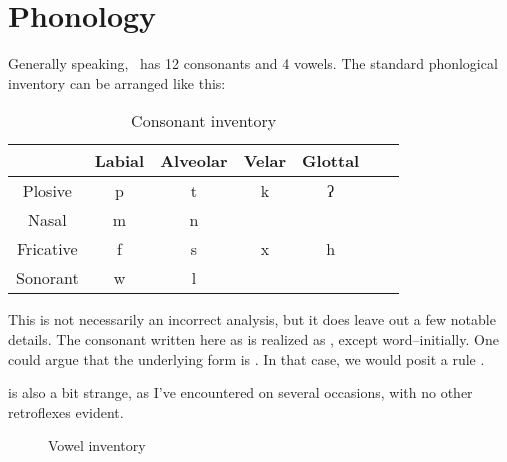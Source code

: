\chapter{Phonology}

Generally speaking, \langname\ has 12 consonants and 4 vowels. The standard phonlogical inventory can be arranged like this:

\begin{table}[ht]


  \centering
  \begin{tabular}{*{7}{c}}
    \toprule
              & Labial & Alveolar & Velar & Glottal \\\midrule
    Plosive   & p      & t        & k     & ʔ       \\
    Nasal     & m      & n        &       &         \\
    Fricative & f      & s        & x     & h       \\
    Sonorant  & w      & l        &       &         \\
    \bottomrule
  \end{tabular}
  \caption{Consonant inventory}
\end{table}

This is not necessarily an incorrect analysis, but it does leave out a few notable details. The consonant written here as  is realized as , except word--initially. One could argue that the underlying form is . In that case, we would posit a rule .


 is also a bit strange, as I've encountered  on several occasions, with no other retroflexes evident.

\begin{figure}[htbp]
  \centering
  \begin{vowel}
  \end{vowel}
  \caption{Vowel inventory}
\end{figure}
